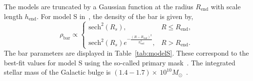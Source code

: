 \documentclass[doublespace,nopageskip]{VTthesis} %
\begin{document}
The models are truncated by a Gaussian function at the
radius $R_{\text{end}}$ with scale length $h_{\text{end}}$. For model S in~\citet{1998ApJ...492..495F}, the density of the bar is given by,
\begin{equation}\label{eq:rhobar}
  \rho_{\text{bar}}\propto \begin{cases}
    \text{sech}^2(R_s), & R \leq R_{\text{end}},\\
    \text{sech}^2(R_s)e^{-\frac{(R-R_{\text{end}})^2}{h_{\text{end}}^2}}, &   R > R_{\text{end}}.
  \end{cases}
\end{equation}
The bar parameters 
are displayed in Table~\ref{tab:modelS}. These correspond to the best-fit values for model S using the so-called primary mask~\cite{1998ApJ...492..495F}. The integrated stellar mass of the Galactic bulge is $(1.4-1.7)\times\ 10^{10} M_\odot$~\cite{2016ARA&A..54..529B}.

\end{document}
